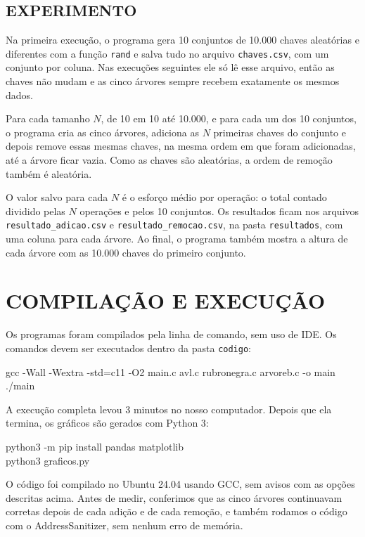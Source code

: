 \subsection{EXPERIMENTO}

Na primeira execução, o programa gera 10 conjuntos de 10.000 chaves aleatórias e diferentes com a função \texttt{rand} e salva tudo no arquivo \texttt{chaves.csv}, com um conjunto por coluna. Nas execuções seguintes ele só lê esse arquivo, então as chaves não mudam e as cinco árvores sempre recebem exatamente os mesmos dados.

Para cada tamanho $N$, de 10 em 10 até 10.000, e para cada um dos 10 conjuntos, o programa cria as cinco árvores, adiciona as $N$ primeiras chaves do conjunto e depois remove essas mesmas chaves, na mesma ordem em que foram adicionadas, até a árvore ficar vazia. Como as chaves são aleatórias, a ordem de remoção também é aleatória.

O valor salvo para cada $N$ é o esforço médio por operação: o total contado dividido pelas $N$ operações e pelos 10 conjuntos. Os resultados ficam nos arquivos \texttt{resultado\_adicao.csv} e \texttt{resultado\_remocao.csv}, na pasta \texttt{resultados}, com uma coluna para cada árvore. Ao final, o programa também mostra a altura de cada árvore com as 10.000 chaves do primeiro conjunto.

\section{COMPILAÇÃO E EXECUÇÃO}

Os programas foram compilados pela linha de comando, sem uso de IDE. Os comandos devem ser executados dentro da pasta \texttt{codigo}:

\begin{flushleft}
\ttfamily
\noindent gcc -Wall -Wextra -std=c11 -O2 main.c avl.c rubronegra.c arvoreb.c -o main\\
./main
\end{flushleft}

A execução completa levou 3 minutos no nosso computador. Depois que ela termina, os gráficos são gerados com Python 3:

\begin{flushleft}
\ttfamily
\noindent python3 -m pip install pandas matplotlib\\
python3 graficos.py
\end{flushleft}

O código foi compilado no Ubuntu 24.04 usando GCC, sem avisos com as opções descritas acima. Antes de medir, conferimos que as cinco árvores continuavam corretas depois de cada adição e de cada remoção, e também rodamos o código com o AddressSanitizer, sem nenhum erro de memória.

